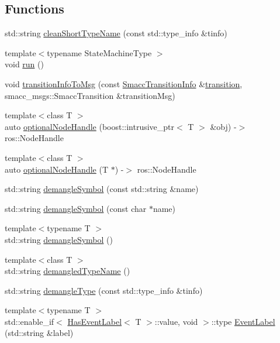 \subsection*{Functions}
\begin{DoxyCompactItemize}
\item 
std\+::string \hyperlink{namespacesmacc_a09b297b1cdb9aae93a958f323431464a}{clean\+Short\+Type\+Name} (const std\+::type\+\_\+info \&tinfo)
\item 
{\footnotesize template$<$typename State\+Machine\+Type $>$ }\\void \hyperlink{namespacesmacc_a47ac3b8d2968b1ba4152afd64ab66bd0}{run} ()
\item 
void \hyperlink{namespacesmacc_a6cda75a51f4a5e29d0a64effb800fb61}{transition\+Info\+To\+Msg} (const \hyperlink{structsmacc_1_1SmaccTransitionInfo}{Smacc\+Transition\+Info} \&\hyperlink{classsmacc_1_1transition}{transition}, smacc\+\_\+msgs\+::\+Smacc\+Transition \&transition\+Msg)
\item 
{\footnotesize template$<$class T $>$ }\\auto \hyperlink{namespacesmacc_a80d4b85f76c7059b35e3d16ec34ea675}{optional\+Node\+Handle} (boost\+::intrusive\+\_\+ptr$<$ T $>$ \&obj) -\/$>$ ros\+::\+Node\+Handle
\item 
{\footnotesize template$<$class T $>$ }\\auto \hyperlink{namespacesmacc_aae43df8cb9ee66ed75e049cb8a7db33c}{optional\+Node\+Handle} (T $\ast$) -\/$>$ ros\+::\+Node\+Handle
\item 
std\+::string \hyperlink{namespacesmacc_a458f5e70d468824fbcd66cc7729deaa8}{demangle\+Symbol} (const std\+::string \&name)
\item 
std\+::string \hyperlink{namespacesmacc_a0b2684b209c8ebb043e0cff3800cc299}{demangle\+Symbol} (const char $\ast$name)
\item 
{\footnotesize template$<$typename T $>$ }\\std\+::string \hyperlink{namespacesmacc_a4dd421d5d4e7617fcf4a9a756797adda}{demangle\+Symbol} ()
\item 
{\footnotesize template$<$class T $>$ }\\std\+::string \hyperlink{namespacesmacc_a78b16538b666c48efe324eec61cc15d7}{demangled\+Type\+Name} ()
\item 
std\+::string \hyperlink{namespacesmacc_a792e7a3ea0843e87543a465b446ae730}{demangle\+Type} (const std\+::type\+\_\+info \&tinfo)
\item 
{\footnotesize template$<$typename T $>$ }\\std\+::enable\+\_\+if$<$ \hyperlink{classsmacc_1_1HasEventLabel}{Has\+Event\+Label}$<$ T $>$\+::value, void $>$\+::type \hyperlink{namespacesmacc_a718cd7f34605a7d59777341924cbfe7e}{Event\+Label} (std\+::string \&label)

\end{DoxyCompactItemize}
